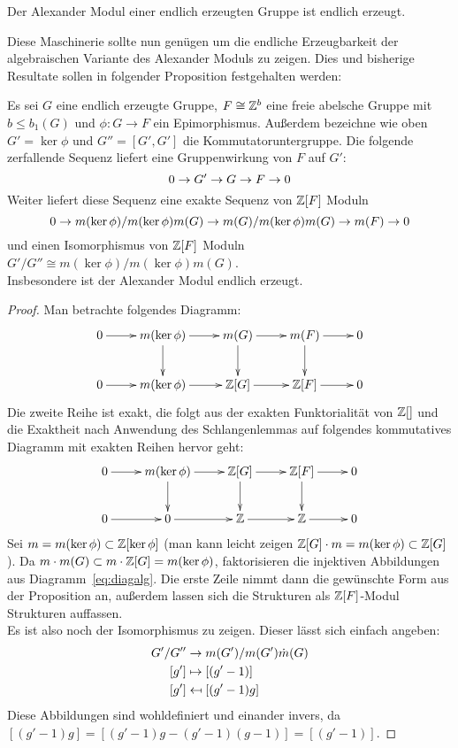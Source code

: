 \begin{lem}
	Der Alexander Modul einer endlich erzeugten Gruppe ist endlich erzeugt.
\end{lem}



Diese Maschinerie sollte nun genügen um die endliche Erzeugbarkeit der algebraischen Variante des Alexander Moduls zu zeigen. Dies und bisherige Resultate sollen in folgender Proposition festgehalten werden:

\begin{prop}
	Es sei $G$ eine endlich erzeugte Gruppe, $F \cong \mathbb{Z}^b$ eine freie abelsche Gruppe mit $b\leq b_1(G)$ und $\phi: G \to F$ ein Epimorphismus. Außerdem bezeichne wie oben $G'=\ker\phi$ und $G''=[G',G']$ die Kommutatoruntergruppe. Die folgende zerfallende Sequenz liefert eine Gruppenwirkung von $F$ auf $G'$:
	\[
		0\to G'\to G\to F\to0
	\]
	Weiter liefert diese Sequenz eine exakte Sequenz von $\mathbb{Z}[F]$ Moduln
	\[
		0\to m(\ker\phi)/m(\ker\phi)m(G)\to m(G)/m(\ker\phi)m(G)\to m(F)\to0
	\]
	und einen Isomorphismus von $\mathbb{Z}[F]$ Moduln $G'/G'' \cong m(\ker\phi)/m(\ker\phi)m(G)$.\\
	Insbesondere ist der Alexander Modul endlich erzeugt.
\end{prop}
\begin{proof}
		Man betrachte folgendes Diagramm:
		\begin{equation}
		\label{eq:diagalg}
			\begin{xy}
				\xymatrix{	0 \ar[r]&	m(\ker\phi) \ar[r] \ar[d]&	m(G) \ar[r] \ar[d]& m(F) \ar[r] \ar[d]&	0\\
							0 \ar[r]&	m(\ker\phi)	\ar[r] 		&	\ZZ[G] \ar[r]	&	\ZZ[F] \ar[r] &		0}
			\end{xy}			
		\end{equation}
		Die zweite Reihe ist exakt, die folgt aus der exakten Funktorialität von $\mathbb{Z}[]$ und die Exaktheit nach Anwendung des Schlangenlemmas auf folgendes kommutatives Diagramm mit exakten Reihen hervor geht:
		\[
			\begin{xy}
				\xymatrix{	0 \ar[r]&	m(\ker\phi) \ar[r] \ar[d]&	\ZZ[G] \ar[r] \ar[d]& \ZZ[F] \ar[r] \ar[d]&	0\\
							0 \ar[r]&		0		\ar[r] 		&	\ZZ \ar[r]	&	\ZZ \ar[r] &		0}
			\end{xy}
		\]
		Sei $m=m(\ker\phi)\subset \mathbb{Z}[\ker\phi]$ (man kann leicht zeigen $\mathbb{Z}[G]\cdot m = m(\ker\phi) \subset \mathbb{Z}[G]$). Da $m\cdot m(G)\subset m\cdot \mathbb{Z}[G] = m(\ker\phi)$, faktorisieren die injektiven Abbildungen aus Diagramm~\ref{eq:diagalg}. Die erste Zeile nimmt dann die gewünschte Form aus der Proposition an, außerdem lassen sich die Strukturen als $\mathbb{Z}[F]$-Modul Strukturen auffassen.\\
		Es ist also noch der Isomorphismus zu zeigen. Dieser lässt sich einfach angeben:
		\begin{align*}
			G'/G'' 	&\to 		m(G')/m(G')\dot m(G)\\
			[g']		&\mapsto	[(g'-1)]\\
			[g']		&\mathrel{\reflectbox{\ensuremath{\mapsto}}}  [(g'-1)g]
		\end{align*}
		Diese Abbildungen sind wohldefiniert und einander invers, da $[(g'-1)g]=[(g'-1)g-(g'-1)(g-1)]=[(g'-1)]$.
	\end{proof}	


